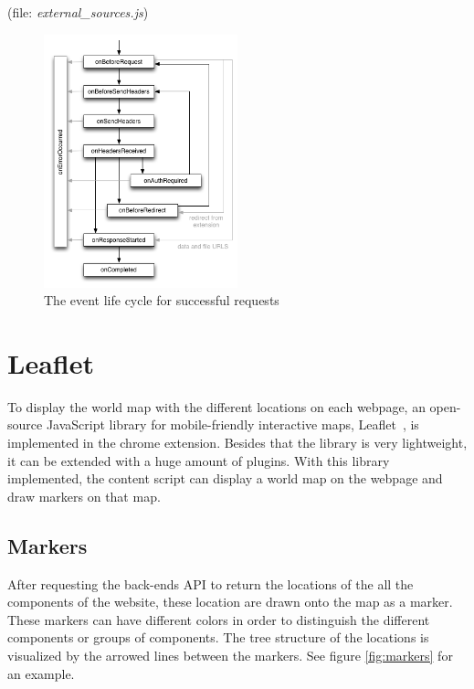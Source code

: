 \documentclass[twoside,openright,notitlepage]{uva-bachelor-thesis}
\begin{document}
(file: \emph{external\_sources.js})

\begin{figure}[h!]
    \centering
    \includegraphics[width=0.5\textwidth, center]{img/headers.png}
    \caption{The event life cycle for successful requests}
    \label{fig:headers}
\end{figure}

\FloatBarrier
\section{Leaflet}
To display the world map with the different locations on each webpage, an open-source JavaScript library for mobile-friendly interactive maps, Leaflet~\cite{leaflet}, is implemented in the chrome extension. Besides that the library is very lightweight, it can be extended with a huge amount of plugins. With this library implemented, the content script can display a world map on the webpage and draw markers on that map.

\subsection{Markers}
After requesting the back-ends API to return the locations of the all the components of the website, these location are drawn onto the map as a marker. These markers can have different colors in order to distinguish the different components or groups of components. The tree structure of the locations is visualized by the arrowed lines between the markers. See figure \ref{fig:markers} for an example.
\end{document}

